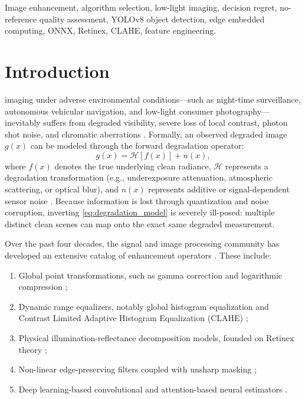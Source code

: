 \documentclass[journal]{IEEEtran}
\begin{document}
\begin{IEEEkeywords}
Image enhancement, algorithm selection, low-light imaging, decision regret, no-reference quality assessment, YOLOv8 object detection, edge embedded computing, ONNX, Retinex, CLAHE, feature engineering.
\end{IEEEkeywords}

\section{Introduction}
 imaging under adverse environmental conditions—such as night-time surveillance, autonomous vehicular navigation, and low-light consumer photography—inevitably suffers from degraded visibility, severe loss of local contrast, photon shot noise, and chromatic aberrations \cite{zheng2024lowlight, wei2018deep}. Formally, an observed degraded image $g(x)$ can be modeled through the forward degradation operator:
\begin{equation}
g(x) = \mathcal{H}[f(x)] + n(x),
\label{eq:degradation_model}
\end{equation}
where $f(x)$ denotes the true underlying clean radiance, $\mathcal{H}$ represents a degradation transformation (e.g., underexposure attenuation, atmospheric scattering, or optical blur), and $n(x)$ represents additive or signal-dependent sensor noise \cite{chen2018learning}. Because information is lost through quantization and noise corruption, inverting \eqref{eq:degradation_model} is severely ill-posed: multiple distinct clean scenes can map onto the exact same degraded measurement.

Over the past four decades, the signal and image processing community has developed an extensive catalog of enhancement operators \cite{zheng2024lowlight}. These include:
\begin{enumerate}
    \item Global point transformations, such as gamma correction and logarithmic compression \cite{bradski2000opencv};
    \item Dynamic range equalizers, notably global histogram equalization and Contrast Limited Adaptive Histogram Equalization (CLAHE) \cite{zuiderveld1994contrast};
    \item Physical illumination-reflectance decomposition models, founded on Retinex theory \cite{land1971lightness, jobson1997multiscale};
    \item Non-linear edge-preserving filters coupled with unsharp masking \cite{tomasi1998bilateral, buades2005nonlocal};
    \item Deep learning-based convolutional and attention-based neural estimators \cite{wei2018deep, guo2020zero}.
\end{enumerate}
\end{document}
